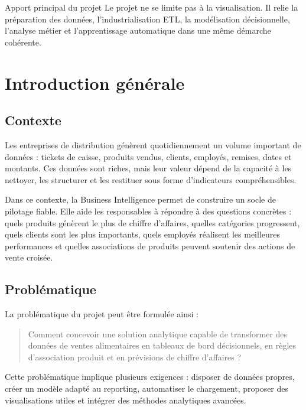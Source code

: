 \documentclass[12pt,a4paper,twoside]{report}
\begin{document}
\begin{infobox}{Apport principal du projet}
Le projet ne se limite pas à la visualisation. Il relie la préparation des données, l'industrialisation ETL, la modélisation décisionnelle, l'analyse métier et l'apprentissage automatique dans une même démarche cohérente.
\end{infobox}

\chapter{Introduction générale}

\section{Contexte}

Les entreprises de distribution génèrent quotidiennement un volume important de données : tickets de caisse, produits vendus, clients, employés, remises, dates et montants. Ces données sont riches, mais leur valeur dépend de la capacité à les nettoyer, les structurer et les restituer sous forme d'indicateurs compréhensibles.

Dans ce contexte, la Business Intelligence permet de construire un socle de pilotage fiable. Elle aide les responsables à répondre à des questions concrètes : quels produits génèrent le plus de chiffre d'affaires, quelles catégories progressent, quels clients sont les plus importants, quels employés réalisent les meilleures performances et quelles associations de produits peuvent soutenir des actions de vente croisée.

\section{Problématique}

La problématique du projet peut être formulée ainsi :

\begin{quote}
Comment concevoir une solution analytique capable de transformer des données de ventes alimentaires en tableaux de bord décisionnels, en règles d'association produit et en prévisions de chiffre d'affaires ?
\end{quote}

Cette problématique implique plusieurs exigences : disposer de données propres, créer un modèle adapté au reporting, automatiser le chargement, proposer des visualisations utiles et intégrer des méthodes analytiques avancées.
\end{document}
